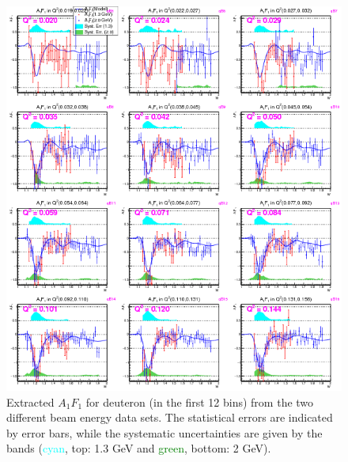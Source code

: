 \begin{figure}[H] %
  \leavevmode \includegraphics[width=1.0\textwidth]{figuresEG4/FigResults/extractedFrmBothEb_A1F1_C71S181NoQeWbins70LessQ2binsNwPd.png} 
  \caption[Extracted $A_1 F_1$ in the first 12 \qsqs bins]{Extracted $A_1 F_1$ for deuteron (in the first 12 \qsqs bins) from the two different beam energy data sets. The statistical errors are indicated by error bars, while the systematic uncertainties are given by the bands (\textcolor{cyan}{cyan}, top: 1.3 GeV and \textcolor{green}{green}, bottom: 2 GeV).}
  \label{extA1F14}  
\end{figure}

